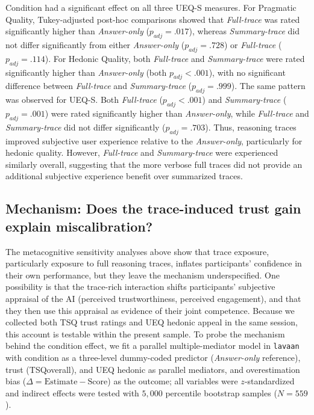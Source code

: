 \documentclass[manuscript, anonymous=false,authorversion,review=false]{acmart}
\begin{document}
Condition had a significant effect on all three UEQ-S measures. For Pragmatic Quality, Tukey-adjusted post-hoc comparisons showed that \textit{Full-trace} was rated significantly higher than \textit{Answer-only} ($p_{adj} = .017$), whereas \textit{Summary-trace} did not differ significantly from either \textit{Answer-only} ($p_{adj} = .728$) or \textit{Full-trace} ($p_{adj} = .114$). For Hedonic Quality, both \textit{Full-trace} and \textit{Summary-trace} were rated significantly higher than \textit{Answer-only} (both $p_{adj} < .001$), with no significant difference between \textit{Full-trace} and \textit{Summary-trace} ($p_{adj} = .999$). The same pattern was observed for UEQ-S. Both \textit{Full-trace} ($p_{adj} < .001$) and \textit{Summary-trace} ($p_{adj} = .001$) were rated significantly higher than \textit{Answer-only}, while \textit{Full-trace} and \textit{Summary-trace} did not differ significantly ($p_{adj} = .703$).
Thus, reasoning traces improved subjective user experience relative to the \textit{Answer-only}, particularly for hedonic quality. However, \textit{Full-trace} and \textit{Summary-trace} were experienced similarly overall, suggesting that the more verbose full traces did not provide an additional subjective experience benefit over summarized traces.


\subsection{Mechanism: Does the trace-induced trust gain explain miscalibration?}
\label{sec:mediation}
The metacognitive sensitivity analyses above show that trace exposure, particularly exposure to full reasoning traces, inflates participants' confidence in their own performance, but they leave the mechanism underspecified.
One possibility is that the trace-rich interaction shifts participants' subjective appraisal of the AI (perceived trustworthiness, perceived engagement), and that they then use this appraisal as evidence of their joint competence. Because we collected both TSQ trust ratings and UEQ hedonic appeal in the same session, this account is testable within the present sample.
To probe the mechanism behind the condition effect, we fit a parallel multiple-mediator model in \texttt{lavaan} with condition as a three-level dummy-coded predictor (\textit{Answer-only} reference), trust (TSQoverall), and UEQ hedonic as parallel mediators, and overestimation bias ($\Delta = \mathrm{Estimate} - \mathrm{Score}$) as the outcome; all variables were $z$-standardized and indirect effects were tested with $5{,}000$ percentile bootstrap samples ($N = 559$).
\end{document}
